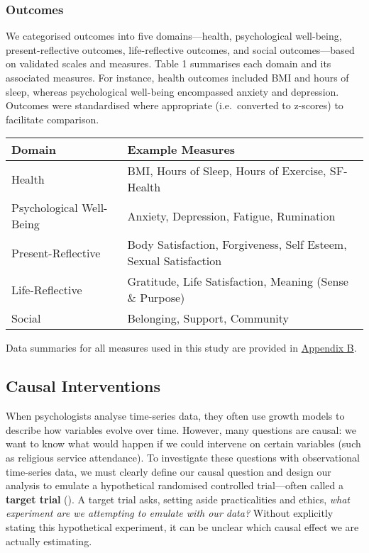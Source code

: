 \documentclass[
  single column]{article}
\begin{document}
\subsubsection{Outcomes}\label{outcomes-1}

We categorised outcomes into five domains---health, psychological
well-being, present-reflective outcomes, life-reflective outcomes, and
social outcomes---based on validated scales and measures. Table 1
summarises each domain and its associated measures. For instance, health
outcomes included BMI and hours of sleep, whereas psychological
well-being encompassed anxiety and depression. Outcomes were
standardised where appropriate (i.e.~converted to z-scores) to
facilitate comparison.

\begin{longtable}[]{@{}
  >{\raggedright\arraybackslash}p{}
  >{\raggedright\arraybackslash}p{}@{}}
\toprule\noalign{}
\begin{minipage}[b]{\linewidth}\raggedright
Domain
\end{minipage} & \begin{minipage}[b]{\linewidth}\raggedright
Example Measures
\end{minipage} \\
\midrule\noalign{}
\endhead
\bottomrule\noalign{}
\endlastfoot
Health & BMI, Hours of Sleep, Hours of Exercise, SF-Health \\
Psychological Well-Being & Anxiety, Depression, Fatigue, Rumination \\
Present-Reflective & Body Satisfaction, Forgiveness, Self Esteem, Sexual
Satisfaction \\
Life-Reflective & Gratitude, Life Satisfaction, Meaning (Sense \&
Purpose) \\
Social & Belonging, Support, Community \\
\end{longtable}

Data summaries for all measures used in this study are provided in
\hyperref[appendix-baseline]{Appendix B}.

\subsection{Causal Interventions}\label{causal-interventions}

When psychologists analyse time-series data, they often use growth
models to describe how variables evolve over time. However, many
questions are causal: we want to know what would happen if we could
intervene on certain variables (such as religious service attendance).
To investigate these questions with observational time-series data, we
must clearly define our causal question and design our analysis to
emulate a hypothetical randomised controlled trial---often called a
\textbf{target trial} (). A target trial asks, setting aside practicalities and ethics,
\emph{what experiment are we attempting to emulate with our data?}
Without explicitly stating this hypothetical experiment, it can be
unclear which causal effect we are actually estimating.
\end{document}
